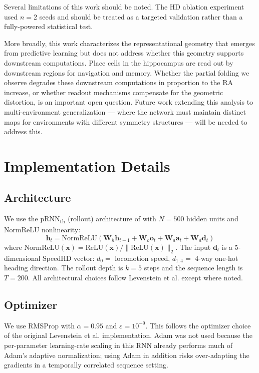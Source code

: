 \documentclass[11pt, a4paper]{article}
\begin{document}
Several limitations of this work should be noted. The HD ablation
experiment used $n=2$ seeds and should be treated as a targeted
validation rather than a fully-powered statistical test.

More broadly, this work characterizes the representational geometry that
emerges from predictive learning but does not address whether this
geometry supports downstream computations. Place cells in the hippocampus
are read out by downstream regions for navigation and memory. Whether the
partial folding we observe degrades these downstream computations in
proportion to the RA increase, or whether readout mechanisms compensate
for the geometric distortion, is an important open question. Future work
extending this analysis to multi-environment generalization --- where
the network must maintain distinct maps for environments with different
symmetry structures --- will be needed to address this.









\appendix
\section{Implementation Details}
\label{app:implementation}

\subsection*{Architecture}
We use the pRNN\textsubscript{th} (rollout) architecture of
\citet{levenstein2024} with $N=500$ hidden units and NormReLU nonlinearity:
\begin{equation}
    \mathbf{h}_t = \text{NormReLU}\!\left(\mathbf{W}_h\mathbf{h}_{t-1} +
    \mathbf{W}_o\mathbf{o}_t + \mathbf{W}_a\mathbf{a}_t +
    \mathbf{W}_d\mathbf{d}_t\right)
\end{equation}
where $\text{NormReLU}(\mathbf{x}) = \text{ReLU}(\mathbf{x}) /
\|\text{ReLU}(\mathbf{x})\|_2$. The input $\mathbf{d}_t$ is a 5-dimensional
SpeedHD vector: $d_0 =$ locomotion speed, $d_{1:4} =$ 4-way one-hot
heading direction. The rollout depth is $k=5$ steps and the sequence
length is $T=200$. All architectural choices follow Levenstein et al.
except where noted.

\subsection*{Optimizer}
We use RMSProp with $\alpha=0.95$ and $\varepsilon=10^{-9}$. This follows
the optimizer choice of the original Levenstein et al. implementation.
Adam was not used because the per-parameter learning-rate scaling in this
RNN already performs much of Adam's adaptive normalization; using Adam in
addition risks over-adapting the gradients in a temporally correlated
sequence setting.
\end{document}
